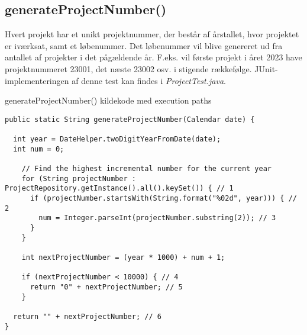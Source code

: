 \subsection{generateProjectNumber()} \label{sec:white_box_generate_project_number}
Hvert projekt har et unikt projektnummer, der består af årstallet, hvor projektet er iværksat, samt et løbenummer. Det løbenummer vil blive genereret ud fra antallet af projekter i det pågældende år. F.eks. vil første projekt i året 2023 have projektnummeret 23001, det næste 23002 osv. i stigende rækkefølge. JUnit-implementeringen af denne test kan findes i \textit{ProjectTest.java}.
\begin{listing}[H]
  \centering
  \caption{generateProjectNumber() kildekode med execution paths}\label{lst:generate_project_number}
  \begin{verbatim}
public static String generateProjectNumber(Calendar date) {

  int year = DateHelper.twoDigitYearFromDate(date);
  int num = 0;

    // Find the highest incremental number for the current year
    for (String projectNumber : ProjectRepository.getInstance().all().keySet()) { // 1
      if (projectNumber.startsWith(String.format("%02d", year))) { // 2
        num = Integer.parseInt(projectNumber.substring(2)); // 3
      }
    }

    int nextProjectNumber = (year * 1000) + num + 1;

    if (nextProjectNumber < 10000) { // 4
      return "0" + nextProjectNumber; // 5
    }

  return "" + nextProjectNumber; // 6
}
    \end{verbatim}
\end{listing}
